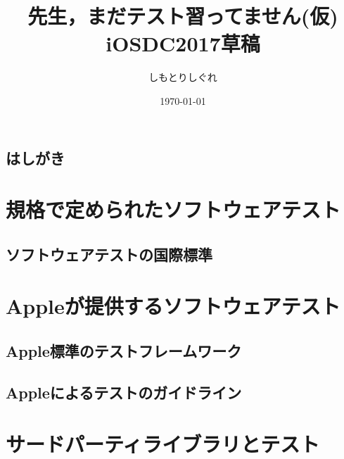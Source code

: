 \documentclass[10pt,twoside,openright,dvipdfmx]{jsbook}
\title{%
    先生，まだテスト習ってません(仮) \\
    \large iOSDC2017草稿}
\author[$\dagger$]{しもとりしぐれ}
\affil[$\dagger$]{@S\_Shimotori}
\date{\today}
\newcommand\blankpage{%
    \null
    \thispagestyle{empty}
    \addtocounter{page}{-1}
    \newpage
}
\begin{document}
\maketitle
\restoregeometry

\afterpage{\blankpage}


\tableofcontents
\thispagestyle{plain}

\chapter*{はしがき}
\thispagestyle{plain}


\cleardoublepage



\part{規格で定められたソフトウェアテスト}\label{part:standard}
\restoregeometry

\chapter{ソフトウェアテストの国際標準}\label{chapter:standard_international}
\thispagestyle{plain}


\part{Appleが提供するソフトウェアテスト}\label{part:apple}
\restoregeometry

\chapter{Apple標準のテストフレームワーク}
\thispagestyle{plain}


\chapter{Appleによるテストのガイドライン}
\thispagestyle{plain}


\part{サードパーティライブラリとテスト}\label{part:thirdparty}
\restoregeometry
\end{document}
